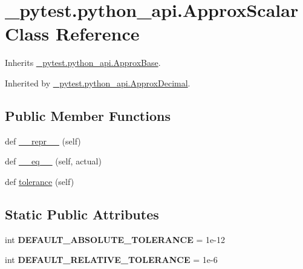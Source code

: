 \hypertarget{class__pytest_1_1python__api_1_1_approx_scalar}{}\section{\+\_\+pytest.\+python\+\_\+api.\+Approx\+Scalar Class Reference}
\label{class__pytest_1_1python__api_1_1_approx_scalar}


Inherits \hyperlink{class__pytest_1_1python__api_1_1_approx_base}{\+\_\+pytest.\+python\+\_\+api.\+Approx\+Base}.



Inherited by \hyperlink{class__pytest_1_1python__api_1_1_approx_decimal}{\+\_\+pytest.\+python\+\_\+api.\+Approx\+Decimal}.

\subsection*{Public Member Functions}
\begin{DoxyCompactItemize}
\item 
def \hyperlink{class__pytest_1_1python__api_1_1_approx_scalar_a34795da00269c99f505c371fa090e258}{\+\_\+\+\_\+repr\+\_\+\+\_\+} (self)
\item 
def \hyperlink{class__pytest_1_1python__api_1_1_approx_scalar_a288411d467ee32f44d11f782dd122a01}{\+\_\+\+\_\+eq\+\_\+\+\_\+} (self, actual)
\item 
def \hyperlink{class__pytest_1_1python__api_1_1_approx_scalar_ad3d6c645f7988064aaf458340d8e1dca}{tolerance} (self)
\end{DoxyCompactItemize}
\subsection*{Static Public Attributes}
\begin{DoxyCompactItemize}
\item 
\mbox{\label{class__pytest_1_1python__api_1_1_approx_scalar_a38779843e6605e66dbef743eee99e038}} 
int {\bfseries D\+E\+F\+A\+U\+L\+T\+\_\+\+A\+B\+S\+O\+L\+U\+T\+E\+\_\+\+T\+O\+L\+E\+R\+A\+N\+CE} = 1e-\/12
\item 
\mbox{\label{class__pytest_1_1python__api_1_1_approx_scalar_ab08251521d5e9f6467d08b7accc15575}} 
int {\bfseries D\+E\+F\+A\+U\+L\+T\+\_\+\+R\+E\+L\+A\+T\+I\+V\+E\+\_\+\+T\+O\+L\+E\+R\+A\+N\+CE} = 1e-\/6
\end{DoxyCompactItemize}

